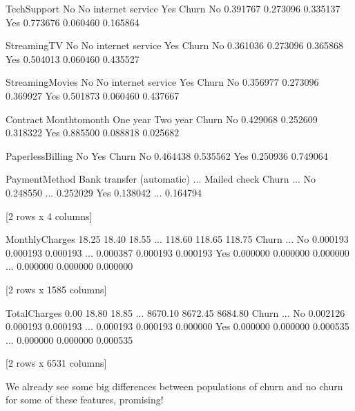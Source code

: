 \documentclass[letterpaper,10pt,english]{jupyterBook}
\begin{document}
\begin{sphinxVerbatim}[commandchars=\\\{\}]
TechSupport        No  No internet service       Yes
Churn                                               
No           0.391767             0.273096  0.335137
Yes          0.773676             0.060460  0.165864

StreamingTV        No  No internet service       Yes
Churn                                               
No           0.361036             0.273096  0.365868
Yes          0.504013             0.060460  0.435527

StreamingMovies        No  No internet service       Yes
Churn                                                   
No               0.356977             0.273096  0.369927
Yes              0.501873             0.060460  0.437667

Contract  Month\PYGZhy{}to\PYGZhy{}month  One year  Two year
Churn                                       
No              0.429068  0.252609  0.318322
Yes             0.885500  0.088818  0.025682

PaperlessBilling        No       Yes
Churn                               
No                0.464438  0.535562
Yes               0.250936  0.749064

PaymentMethod  Bank transfer (automatic)  ...  Mailed check
Churn                                     ...              
No                              0.248550  ...      0.252029
Yes                             0.138042  ...      0.164794

[2 rows x 4 columns]

MonthlyCharges    18.25     18.40     18.55   ...    118.60    118.65    118.75
Churn                                         ...                              
No              0.000193  0.000193  0.000193  ...  0.000387  0.000193  0.000193
Yes             0.000000  0.000000  0.000000  ...  0.000000  0.000000  0.000000

[2 rows x 1585 columns]

TotalCharges   0.00      18.80     18.85    ...   8670.10   8672.45   8684.80
Churn                                       ...                              
No            0.002126  0.000193  0.000193  ...  0.000193  0.000193  0.000000
Yes           0.000000  0.000000  0.000535  ...  0.000000  0.000000  0.000535

[2 rows x 6531 columns]
\end{sphinxVerbatim}

\sphinxAtStartPar
We already see some big differences between populations of churn and no churn for some of these features, promising!
\end{document}
